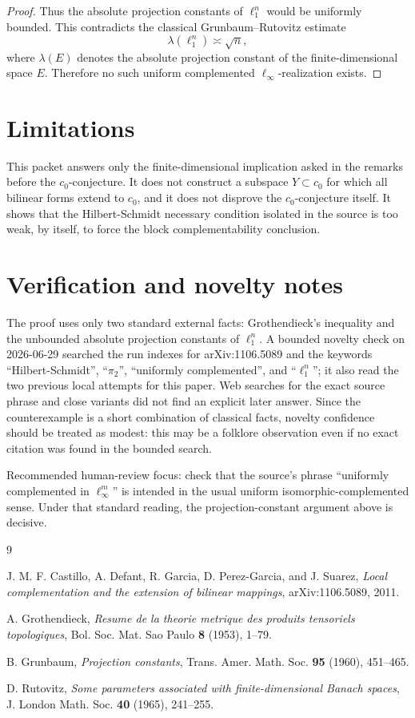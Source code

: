 \documentclass[11pt]{article}
\begin{document}
\begin{proof}
Thus the absolute projection constants of \(\ell_1^n\) would be
uniformly bounded.  This contradicts the classical Grunbaum--Rutovitz
estimate
\[
        \lambda(\ell_1^n)\asymp \sqrt n,
\]
where \(\lambda(E)\) denotes the absolute projection constant of the
finite-dimensional space \(E\).  Therefore no such uniform complemented
\(\ell_\infty\)-realization exists.
\end{proof}

\section*{Limitations}

This packet answers only the finite-dimensional implication asked in the
remarks before the \(c_0\)-conjecture.  It does not construct a subspace
\(Y\subset c_0\) for which all bilinear forms extend to \(c_0\), and it
does not disprove the \(c_0\)-conjecture itself.  It shows that the
Hilbert-Schmidt necessary condition isolated in the source is too weak,
by itself, to force the block complementability conclusion.

\section*{Verification and novelty notes}

The proof uses only two standard external facts: Grothendieck's
inequality and the unbounded absolute projection constants of
\(\ell_1^n\).  A bounded novelty check on 2026-06-29 searched the run
indexes for arXiv:1106.5089 and the keywords ``Hilbert-Schmidt'',
``\(\pi_2\)'', ``uniformly complemented'', and ``\(\ell_1^n\)''; it also
read the two previous local attempts for this paper.  Web searches for
the exact source phrase and close variants did not find an explicit
later answer.  Since the counterexample is a short combination of
classical facts, novelty confidence should be treated as modest: this may
be a folklore observation even if no exact citation was found in the
bounded search.

Recommended human-review focus: check that the source's phrase
``uniformly complemented in \(\ell_\infty^m\)'' is intended in the usual
uniform isomorphic-complemented sense.  Under that standard reading, the
projection-constant argument above is decisive.

\begin{thebibliography}{9}

J. M. F. Castillo, A. Defant, R. Garcia, D. Perez-Garcia, and J. Suarez,
\emph{Local complementation and the extension of bilinear mappings},
arXiv:1106.5089, 2011.

A. Grothendieck,
\emph{Resume de la theorie metrique des produits tensoriels topologiques},
Bol. Soc. Mat. Sao Paulo \textbf{8} (1953), 1--79.

B. Grunbaum,
\emph{Projection constants},
Trans. Amer. Math. Soc. \textbf{95} (1960), 451--465.

D. Rutovitz,
\emph{Some parameters associated with finite-dimensional Banach spaces},
J. London Math. Soc. \textbf{40} (1965), 241--255.

\end{thebibliography}
\end{document}
